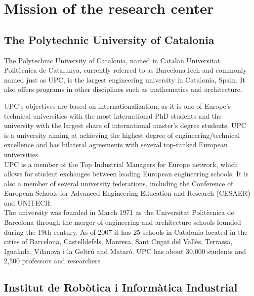 
\chapter{Mission of the research center}
\label{context}


\newcommand{\keyword}[1]{\textbf{#1}}
\newcommand{\tabhead}[1]{\textbf{#1}}
\newcommand{\code}[1]{\texttt{#1}}
\newcommand{\file}[1]{\texttt{\bfseries#1}}
\newcommand{\option}[1]{\texttt{\itshape#1}}


\section{The Polytechnic University of Catalonia}

The Polytechnic University of Catalonia, named in Catalan Universitat Politècnica de Catalunya, currently referred to as BarcelonaTech and commonly named just as UPC, is the largest engineering university in Catalonia, Spain.
It also offers programs in other disciplines such as mathematics and architecture.

UPC's objectives are based on internationalization, as it is one of Europe's technical universities with the most international PhD students and the university with the largest share of international master's degree students.
UPC is a university aiming at achieving the highest degree of engineering/technical excellence and has bilateral agreements with several top-ranked European universities.\\


UPC is a member of the Top Industrial Managers for Europe network, which allows for student exchanges between leading European engineering schools.
It is also a member of several university federations, including the Conference of European Schools for Advanced Engineering Education and Research (CESAER) and UNITECH.\\

The university was founded in March 1971 as the Universitat Politècnica de Barcelona through the merger of engineering and architecture schools founded during the 19th century.
As of 2007 it has 25 schools in Catalonia located in the cities of Barcelona, Castelldefels, Manresa, Sant Cugat del Vallès, Terrassa, Igualada, Vilanova i la Geltrú and Mataró.
UPC has about 30,000 students and 2,500 professors and researchers

\section{Institut de Robòtica i Informàtica Industrial}




